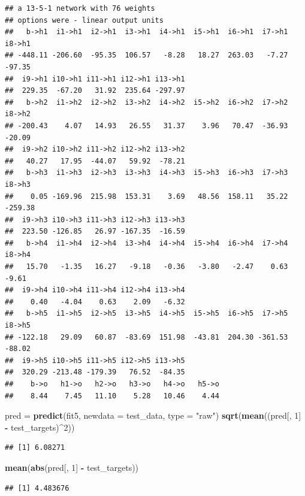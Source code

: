 \documentclass[10pt,ignorenonframetext,]{beamer}
\newenvironment{Shaded}{\begin{snugshade}}{\end{snugshade}}
\newcommand{\DataTypeTok}[1]{\textcolor[rgb]{0.13,0.29,0.53}{#1}}
\newcommand{\DecValTok}[1]{\textcolor[rgb]{0.00,0.00,0.81}{#1}}
\newcommand{\KeywordTok}[1]{\textcolor[rgb]{0.13,0.29,0.53}{\textbf{#1}}}
\newcommand{\NormalTok}[1]{#1}
\newcommand{\OperatorTok}[1]{\textcolor[rgb]{0.81,0.36,0.00}{\textbf{#1}}}
\newcommand{\StringTok}[1]{\textcolor[rgb]{0.31,0.60,0.02}{#1}}
\begin{document}
\begin{frame}[fragile]
\begin{verbatim}
## a 13-5-1 network with 76 weights
## options were - linear output units 
##   b->h1  i1->h1  i2->h1  i3->h1  i4->h1  i5->h1  i6->h1  i7->h1  i8->h1 
## -448.11 -206.60  -95.35  106.57   -8.28   18.27  263.03   -7.27  -97.35 
##  i9->h1 i10->h1 i11->h1 i12->h1 i13->h1 
##  229.35  -67.20   31.92  235.64 -297.97 
##   b->h2  i1->h2  i2->h2  i3->h2  i4->h2  i5->h2  i6->h2  i7->h2  i8->h2 
## -200.43    4.07   14.93   26.55   31.37    3.96   70.47  -36.93  -20.09 
##  i9->h2 i10->h2 i11->h2 i12->h2 i13->h2 
##   40.27   17.95  -44.07   59.92  -78.21 
##   b->h3  i1->h3  i2->h3  i3->h3  i4->h3  i5->h3  i6->h3  i7->h3  i8->h3 
##    0.05 -169.96  215.98  153.31    3.69   48.56  158.11   35.22 -259.38 
##  i9->h3 i10->h3 i11->h3 i12->h3 i13->h3 
##  223.50 -126.85   26.97 -167.35  -16.59 
##   b->h4  i1->h4  i2->h4  i3->h4  i4->h4  i5->h4  i6->h4  i7->h4  i8->h4 
##   15.70   -1.35   16.27   -9.18   -0.36   -3.80   -2.47    0.63   -9.61 
##  i9->h4 i10->h4 i11->h4 i12->h4 i13->h4 
##    0.40   -4.04    0.63    2.09   -6.32 
##   b->h5  i1->h5  i2->h5  i3->h5  i4->h5  i5->h5  i6->h5  i7->h5  i8->h5 
## -122.18   29.09   60.87  -83.69  151.98  -43.81  204.30 -361.53  -88.02 
##  i9->h5 i10->h5 i11->h5 i12->h5 i13->h5 
##  320.29 -213.48 -179.39   76.52  -84.35 
##    b->o   h1->o   h2->o   h3->o   h4->o   h5->o 
##    8.44    7.45   11.10    5.28   10.46    4.44
\end{verbatim}

\begin{Shaded}
\begin{Highlighting}[]
\NormalTok{pred =}\StringTok{ }\KeywordTok{predict}\NormalTok{(fit5, }\DataTypeTok{newdata =}\NormalTok{ test_data, }\DataTypeTok{type =} \StringTok{"raw"}\NormalTok{)}
\KeywordTok{sqrt}\NormalTok{(}\KeywordTok{mean}\NormalTok{((pred[, }\DecValTok{1}\NormalTok{] }\OperatorTok{-}\StringTok{ }\NormalTok{test_targets)}\OperatorTok{^}\DecValTok{2}\NormalTok{))}
\end{Highlighting}
\end{Shaded}

\begin{verbatim}
## [1] 6.08271
\end{verbatim}

\begin{Shaded}
\begin{Highlighting}[]
\KeywordTok{mean}\NormalTok{(}\KeywordTok{abs}\NormalTok{(pred[, }\DecValTok{1}\NormalTok{] }\OperatorTok{-}\StringTok{ }\NormalTok{test_targets))}
\end{Highlighting}
\end{Shaded}

\begin{verbatim}
## [1] 4.483676
\end{verbatim}

\end{frame}
\end{document}
